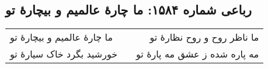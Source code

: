 \begin{center}
\section*{رباعی شماره ۱۵۸۴: ما چارهٔ عالمیم و بیچارهٔ تو}
\label{sec:1584}
\begin{longtable}{l p{0.5cm} r}
ما چارهٔ عالمیم و بیچارهٔ تو
&&
ما ناظر روح و روح نظارهٔ تو
\\
خورشید بگرد خاک سیارهٔ تو
&&
مه پاره شده ز عشق مه پارهٔ تو
\\
\end{longtable}
\end{center}
